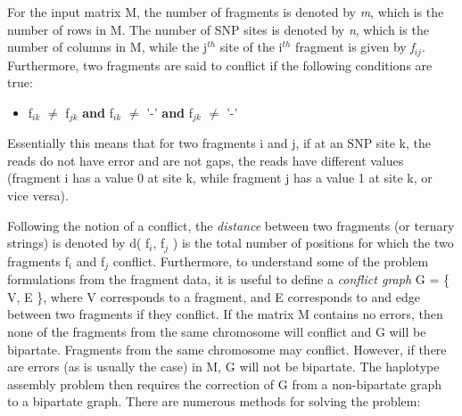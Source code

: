 \documentclass[10pt,twocolumn]{witseiepaper}
\begin{document}
For the input matrix M, the number of fragments is denoted by \textit{m}, which is the number of rows in M.
The number of SNP sites is denoted by \textit{n}, which is the number of columns in M, while the j$^{th}$ 
site of the i$^{th}$ fragment is given by \textit{f$_{ij}$}. Furthermore, two fragments are said to 
conflict if the following conditions are true:
\begin{itemize}
    \item{f$_{ik}$ $\neq$ f$_{jk}$ \textbf{and} f$_{ik}$ $\neq$ '-' \textbf{and} f$_{jk}$ $\neq$ '-' }
\end{itemize}
Essentially this means that for two fragments i and j, if at an SNP site k, the reads do not have error and are 
not gaps, the reads have different values (fragment i has a value 0 at site k, while fragment j has a value 
1 at site k, or vice versa). 

Following the notion of a conflict, the \textit{distance} between two fragments (or ternary strings) is
denoted by d( f$_i$, f$_j$ ) is the total number of positions for which the two fragments f$_i$ and f$_j$
conflict. Furthermore, to understand some of the problem formulations from the fragment data, it is useful to
define a \textit{conflict graph} \cite{lancia:2001} G = \{ V, E \}, where V corresponds to a fragment, and E
corresponds to and edge between two fragments if they conflict. If the matrix M contains no errors, then none
of the fragments from the same chromosome will conflict and G will be bipartate. Fragments from the same
chromosome may conflict. However, if there are errors (as is usually the case) in M, G will not be
bipartate. The haplotype assembly problem then requires the correction of G from a non-bipartate 
graph to a bipartate graph. There are numerous methods for solving the problem:
\end{document}
